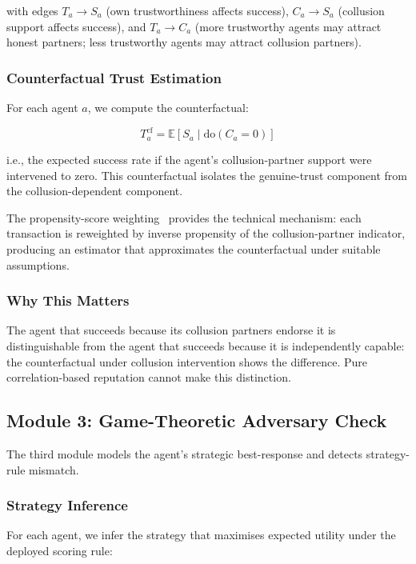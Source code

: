 \documentclass[sigconf,nonacm]{acmart}
\begin{document}
with edges $T_a \to S_a$ (own trustworthiness affects success), $C_a
\to S_a$ (collusion support affects success), and $T_a \to C_a$
(more trustworthy agents may attract honest partners; less
trustworthy agents may attract collusion partners).

\subsubsection{Counterfactual Trust Estimation}

For each agent $a$, we compute the counterfactual:

\begin{equation}
  T_a^{\text{cf}} = \mathbb{E}[S_a \mid \text{do}(C_a = 0)]
\end{equation}

i.e., the expected success rate if the agent's collusion-partner
support were intervened to zero. This counterfactual isolates the
genuine-trust component from the collusion-dependent component.

The propensity-score weighting~\cite{rosenbaum1983propensity} provides
the technical mechanism: each transaction is reweighted by inverse
propensity of the collusion-partner indicator, producing an estimator
that approximates the counterfactual under suitable assumptions.

\subsubsection{Why This Matters}

The agent that succeeds because its collusion partners endorse it is
distinguishable from the agent that succeeds because it is
independently capable: the counterfactual under collusion intervention
shows the difference. Pure correlation-based reputation cannot make
this distinction.

\subsection{Module 3: Game-Theoretic Adversary Check}

The third module models the agent's strategic best-response and
detects strategy-rule mismatch.

\subsubsection{Strategy Inference}

For each agent, we infer the strategy that maximises expected utility
under the deployed scoring rule:
\end{document}
